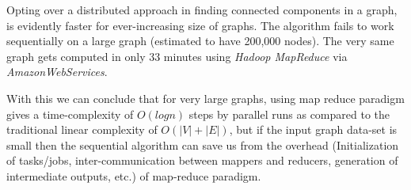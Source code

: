 Opting over a distributed approach in finding connected components in a graph, is evidently faster for ever-increasing size of graphs. The algorithm fails to work sequentially on a large graph (estimated to have 200,000 nodes). The very same graph gets computed in only 33 minutes using \textit{Hadoop MapReduce} via \textit{AmazonWebServices}.

With this we can conclude that for very large graphs, using map reduce paradigm gives a time-complexity of \textit{$O(logn)$} steps by parallel runs as compared to the traditional linear complexity of \textit{$O(|V| + |E|)$}, but if the input graph data-set is small then the sequential algorithm can save us from the overhead  (\eg Initialization of tasks/jobs, inter-communication between mappers and reducers, generation of intermediate outputs, etc.) of map-reduce paradigm.